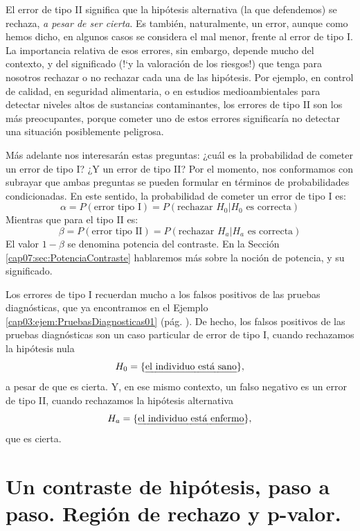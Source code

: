 El {\sf error de tipo II} significa que la hipótesis alternativa (la que defendemos) se rechaza, {\em a pesar de ser cierta}. Es también, naturalmente, un error, aunque como hemos dicho, en algunos casos se considera el mal menor, frente al error de tipo I. La importancia relativa de esos errores, sin embargo, depende mucho del contexto, y del significado ({!`}y la valoración de los riesgos!) que tenga para nosotros rechazar o no rechazar cada una  de las hipótesis. Por ejemplo, en control de calidad, en seguridad alimentaria, o en estudios medioambientales para detectar niveles altos de sustancias contaminantes, los errores de tipo II son los más preocupantes, porque cometer uno de estos errores significaría no detectar una situación posiblemente peligrosa.

Más adelante nos interesarán estas preguntas: ¿cuál es la probabilidad de cometer un error de tipo I? ¿Y un error de tipo II? Por el momento, nos conformamos con subrayar que ambas preguntas se pueden formular en términos de probabilidades condicionadas. En este sentido, la probabilidad de cometer un error de tipo I es:
    \begin{equation}\label{cap07:ecu:AlfaErrorTipoI}
        \alpha=P(\mbox{error tipo I})=P(\mbox{rechazar $H_0$}|\mbox{$H_0$ es correcta})
    \end{equation}
Mientras que para el tipo II es:
    \begin{equation}\label{cap07:ecu:BetaErrorTipoII}
        \beta=P(\mbox{error tipo II})=P(\mbox{rechazar $H_a$}|\mbox{$H_a$ es correcta})
    \end{equation}
El valor $1-\beta$ se denomina {\sf potencia del contraste}. En la Sección \ref{cap07:sec:PotenciaContraste} hablaremos más sobre la noción de potencia, y  su significado.

Los errores de tipo I recuerdan mucho a los falsos positivos de las pruebas diagnósticas, que ya encontramos en el Ejemplo \ref{cap03:ejem:PruebasDiagnosticas01} (pág. \pageref{cap03:ejem:PruebasDiagnosticas01}). De hecho, los falsos positivos de las pruebas diagnósticas son un caso particular de error de tipo I, cuando rechazamos la hipótesis nula
    \[H_0=\{\mbox{\em el individuo está sano}\},\]
a pesar de que es cierta. Y, en ese mismo contexto, un falso negativo es un error de tipo II, cuando rechazamos la hipótesis alternativa
    \[H_a=\{\mbox{\em el individuo está enfermo}\},\]
que es cierta.

\section{Un contraste de hipótesis, paso a paso. Región de rechazo y p-valor.}
\label{cap07:sec:ContrasteHipotesisPasoaPaso}

